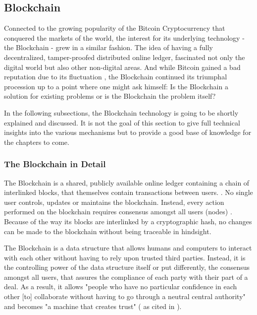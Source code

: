 \subsection{Blockchain}
\label{subsec:02_blockchain}

Connected to the growing popularity of the Bitcoin Cryptocurrency that conquered the markets of the world, the interest for its underlying technology - the Blockchain - grew in a similar fashion. The idea of having a fully decentralized, tamper-proofed distributed online ledger, fascinated not only the digital world but also other non-digital areas. And while Bitcoin gained a bad reputation due to its fluctuation \cite{Shackelford2016}, the Blockchain continued its triumphal procession up to a point where one might ask himself: Is the Blockchain a solution for existing problems or is the Blockchain the problem itself? \cite{Stinchcombe2017, Nielsen2018, Lunn2015}

In the following subsections, the Blockchain technology is going to be shortly explained and discussed. It is not the goal of this section to give full technical insights into the various mechanisms but to provide a good base of knowledge for the chapters to come.

\subsubsection{The Blockchain in Detail}
The Blockchain is a shared, publicly available online ledger containing a chain of interlinked blocks, that themselves contain transactions between users. \cite{Wust2017}. No single user controls, updates or maintains the blockchain. Instead, every action performed on the blockchain requires consensus amongst all users (nodes) \cite{Shackelford2016}. Because of the way its blocks are interlinked by a cryptographic hash, no changes can be made to the blockchain without being traceable in hindsight.

The Blockchain is a data structure that allows humans and computers to interact with each other without having to rely upon trusted third parties. Instead, it is the controlling power of the data structure itself or put differently, the consensus amongst all users, that assures the compliance of each party with their part of a deal. As a result, it allows "people who have no particular confidence in each other [to] collaborate without having to go through a neutral central authority" and becomes "a machine that creates trust" (\cite{Economist2015} as cited in \cite{Shackelford2016}).

